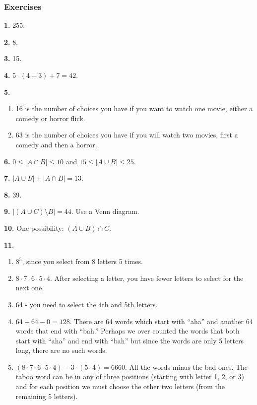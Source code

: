 \documentclass[10pt,]{memoir}
\theoremstyle{plain}
\theoremstyle{definition}
\theoremstyle{definition}
\theoremstyle{definition}
\numberwithin{equation}{chapter}
\begin{document}
\subsubsection*{ Exercises}
\noindent\textbf{1.}\quad{}
255.
%
\par\smallskip
\noindent\textbf{2.}\quad{}
8.
%
\par\smallskip
\noindent\textbf{3.}\quad{}
15.
%
\par\smallskip
\noindent\textbf{4.}\quad{}
\(5\cdot (4+3) + 7 = 42\).
%
\par\smallskip
\noindent\textbf{5.}\quad{}\leavevmode%
\begin{enumerate}[label=(\alph*)]
\item\hypertarget{li-383}{}
16 is the number of choices you have if you want to watch one movie, either a comedy or horror flick.
%
\item\hypertarget{li-384}{}
63 is the number of choices you have if you will watch two movies, first a comedy and then a horror.
%
\end{enumerate}
\par\smallskip
\noindent\textbf{6.}\quad{}
\(0 \le |A \cap B| \le 10\) and \(15 \le |A \cup B| \le 25\).
%
\par\smallskip
\noindent\textbf{7.}\quad{}
\(|A \cup B| + |A \cap B| = 13\).
%
\par\smallskip
\noindent\textbf{8.}\quad{}
39.
%
\par\smallskip
\noindent\textbf{9.}\quad{}
\(|(A \cup C)\setminus B| = 44\). Use a Venn diagram.
%
\par\smallskip
\noindent\textbf{10.}\quad{}
One possibility: \((A \cup B) \cap C\).
%
\par\smallskip
\noindent\textbf{11.}\quad{}\leavevmode%
\begin{enumerate}[label=(\alph*)]
\item\hypertarget{li-390}{}\(8^5\), since you select from 8 letters 5 times.\item\hypertarget{li-391}{}\(8\cdot 7\cdot 6\cdot 5\cdot 4\).  After selecting a letter, you have fewer letters to select for the next one.\item\hypertarget{li-392}{}
64 - you need to select the 4th and 5th letters.
%
\item\hypertarget{li-393}{}\(64 + 64 - 0 = 128\).  There are 64 words which start with ``aha'' and another 64 words that end with ``bah.''  Perhaps we over counted the words that both start with ``aha'' and end with ``bah'' but since the words are only 5 letters long, there are no such words.\item\hypertarget{li-394}{}\((8\cdot 7\cdot 6\cdot 5\cdot 4) - 3\cdot (5\cdot 4) = 6660\). All the words minus the bad ones.  The taboo word can be in any of three positions (starting with letter 1, 2, or 3) and for each position we must choose the other two letters (from the remaining 5 letters).\end{enumerate}
\par\smallskip
\typeout{************************************************}
\typeout{************************************************}
\end{document}
